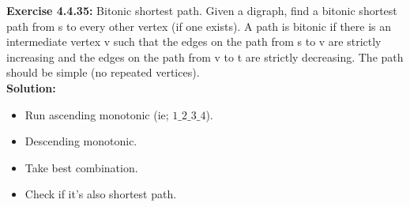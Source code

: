 \documentclass[11pt,fleqn]{article}
\begin{document}
\textbf{Exercise 4.4.35:}  Bitonic shortest path. Given a digraph, find a bitonic shortest path from s to every
other vertex (if one exists). A path is bitonic if there is an intermediate vertex v such
that the edges on the path from s to v are strictly increasing and the edges on the path
from v to t are strictly decreasing. The path should be simple (no repeated vertices).\\

\textbf{Solution:}

\begin{itemize}
	\item Run ascending monotonic (ie; $1\_2\_3\_4$).
	\item Descending monotonic.
	\item Take best combination.
	\item Check if it's also shortest path.
\end{itemize}


	
\end{document}
